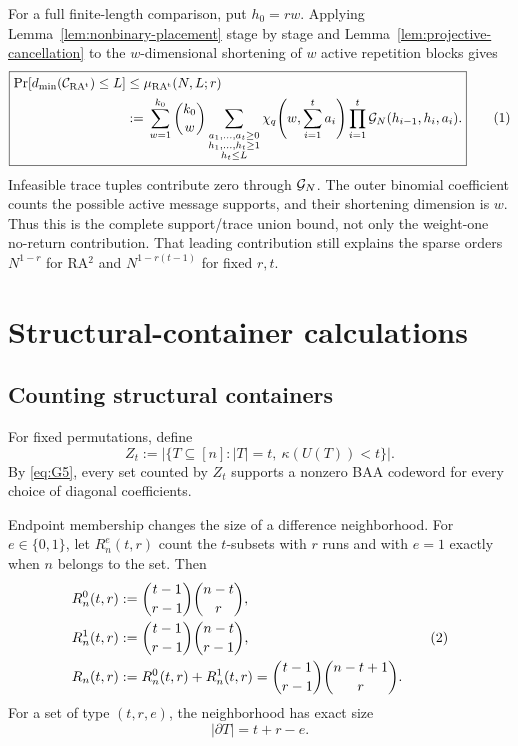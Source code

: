 For a full finite-length comparison, put $h_0=rw$.  Applying
Lemma~\ref{lem:nonbinary-placement} stage by stage and
Lemma~\ref{lem:projective-cancellation} to the $w$-dimensional shortening of
$w$ active repetition blocks gives
\[
\boxed{
\begin{aligned}
 \Prb[d_{\min}(\cC_{\rm RA^t})\le L]
 &\le \mu_{\rm RA^t}(N,L;r)\\
 &:={}
 \sum_{w=1}^{k_0}\binom{k_0}{w}
 \sum_{\substack{a_1,\ldots,a_t\ge0\\
                   h_1,\ldots,h_t\ge1\\ h_t\le L}}
 \chi_q\!\left(w,\sum_{i=1}^t a_i\right)
 \prod_{i=1}^t \cG_N(h_{i-1},h_i,a_i).
\end{aligned}}
\eqnumlabel{eq:rat-complete-bound}
\]
Infeasible trace tuples contribute zero through $\mathcal G_N$.  The outer binomial
coefficient counts the possible active message supports, and their shortening
dimension is $w$.  Thus this is the complete support/trace union bound, not only
the weight-one no-return contribution.  That leading contribution still
explains the sparse orders $N^{1-r}$ for RA$^2$ and
$N^{1-r(t-1)}$ for fixed $r,t$.




\section{Structural-container calculations}

\subsection{Counting structural containers}
\label{app:container-count}



For fixed permutations, define
\[
    Z_t
      :=
    \bigl|\{T\subseteq[n]:|T|=t,\ \kappa(U(T))<t\}\bigr|.
\]
By \eqref{eq:G5}, every set counted by $Z_t$ supports a nonzero BAA codeword for every
choice of diagonal coefficients.

Endpoint membership changes the size of a difference neighborhood.  For
$e\in\{0,1\}$, let $R_n^e(t,r)$ count the $t$-subsets with $r$ runs and with
$e=1$ exactly when $n$ belongs to the set.  Then
\[
\begin{aligned}
    R_n^0(t,r)
      &:=\binom{t-1}{r-1}\binom{n-t}{r},\\
    R_n^1(t,r)
      &:=\binom{t-1}{r-1}\binom{n-t}{r-1},\\
    R_n(t,r)
      &:=R_n^0(t,r)+R_n^1(t,r)
       =\binom{t-1}{r-1}\binom{n-t+1}{r}.
\end{aligned}
\eqnumlabel{eq:G6}
\]
For a set of type $(t,r,e)$, the neighborhood has exact size
\[
    |\partial T|=t+r-e.
\]

